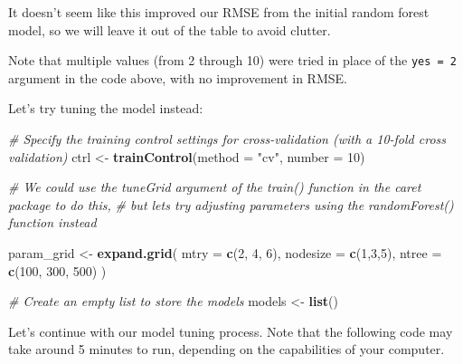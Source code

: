 \documentclass[
]{article}
\newenvironment{Shaded}{\begin{snugshade}}{\end{snugshade}}
\newcommand{\AttributeTok}[1]{\textcolor[rgb]{0.13,0.29,0.53}{#1}}
\newcommand{\CommentTok}[1]{\textcolor[rgb]{0.56,0.35,0.01}{\textit{#1}}}
\newcommand{\DecValTok}[1]{\textcolor[rgb]{0.00,0.00,0.81}{#1}}
\newcommand{\FunctionTok}[1]{\textcolor[rgb]{0.13,0.29,0.53}{\textbf{#1}}}
\newcommand{\NormalTok}[1]{#1}
\newcommand{\OtherTok}[1]{\textcolor[rgb]{0.56,0.35,0.01}{#1}}
\newcommand{\StringTok}[1]{\textcolor[rgb]{0.31,0.60,0.02}{#1}}
\begin{document}
It doesn't seem like this improved our RMSE from the initial random
forest model, so we will leave it out of the table to avoid clutter.

Note that multiple values (from 2 through 10) were tried in place of the
\texttt{yes\ =\ 2} argument in the code above, with no improvement in
RMSE.

Let's try tuning the model instead:

\begin{Shaded}
\begin{Highlighting}[]
\CommentTok{\# Specify the training control settings for cross{-}validation (with a 10{-}fold cross validation)}
\NormalTok{ctrl }\OtherTok{\textless{}{-}} \FunctionTok{trainControl}\NormalTok{(}\AttributeTok{method =} \StringTok{"cv"}\NormalTok{, }\AttributeTok{number =} \DecValTok{10}\NormalTok{)}

\CommentTok{\# We could use the tuneGrid argument of the train() function in the caret package to do this,}
\CommentTok{\# but let\textquotesingle{}s try adjusting parameters using the randomForest() function instead }

\NormalTok{param\_grid }\OtherTok{\textless{}{-}} \FunctionTok{expand.grid}\NormalTok{(}
  \AttributeTok{mtry =} \FunctionTok{c}\NormalTok{(}\DecValTok{2}\NormalTok{, }\DecValTok{4}\NormalTok{, }\DecValTok{6}\NormalTok{),}
  \AttributeTok{nodesize =} \FunctionTok{c}\NormalTok{(}\DecValTok{1}\NormalTok{,}\DecValTok{3}\NormalTok{,}\DecValTok{5}\NormalTok{),}
  \AttributeTok{ntree =} \FunctionTok{c}\NormalTok{(}\DecValTok{100}\NormalTok{, }\DecValTok{300}\NormalTok{, }\DecValTok{500}\NormalTok{)}
\NormalTok{)}

\CommentTok{\# Create an empty list to store the models}
\NormalTok{models }\OtherTok{\textless{}{-}} \FunctionTok{list}\NormalTok{()}
\end{Highlighting}
\end{Shaded}

Let's continue with our model tuning process. Note that the following
code may take around 5 minutes to run, depending on the capabilities of
your computer.
\end{document}
